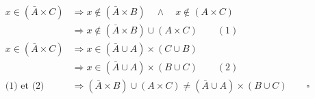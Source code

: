 \begin{align*}
	x \in (\bar{A} \times C) & \Rightarrow x \notin (\bar{A} \times B) \quad \wedge \quad x \notin (A \times C)         \\
	                         & \Rightarrow x \notin (\bar{A} \times B) \cup (A \times C) \qquad (1)                     \\
	x \in (\bar{A} \times C) & \Rightarrow x \in (\bar{A} \cup A) \times (C \cup B)                                     \\
	                         & \Rightarrow x \in (\bar{A} \cup A) \times (B \cup C) \qquad (2)                          \\
	\text{(1) et (2)}        & \Rightarrow (\bar{A} \times B) \cup (A \times C) \neq (\bar{A} \cup A) \times (B \cup C) \qquad \square
\end{align*}
